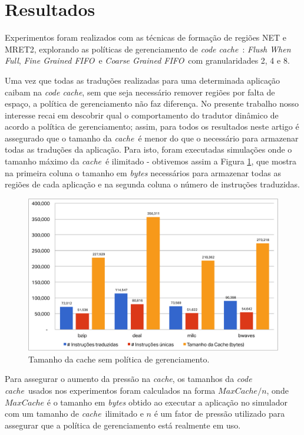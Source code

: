 \documentclass[12pt,twoside]{article}
\newcommand{\ccache}{\emph{code cache}}
\newcommand{\cache}{\emph{cache}}
\newcommand{\flush}{\emph{Flush When Full}}
\newcommand{\finefifo}{\emph{Fine Grained FIFO}}
\newcommand{\coarsefifo}{\emph{Coarse Grained FIFO}}
\begin{document}
\section{Resultados}
Experimentos foram realizados com as técnicas de formação de regiões NET e MRET2, explorando as políticas de gerenciamento de \ccache~: \flush, \finefifo~e \coarsefifo~com granularidades 2, 4 e 8. 

Uma vez que todas as traduções realizadas para uma determinada aplicação caibam na \ccache, sem que seja necessário remover regiões por falta de espaço, a política de gerenciamento não faz diferença. No presente trabalho nosso interesse recai em descobrir qual o comportamento do tradutor dinâmico de acordo a política de gerenciamento; assim, para todos os resultados neste artigo é assegurado que o tamanho da \cache~é menor do que o necessário para armazenar todas as traduções da aplicação. Para isto, foram executadas simulações onde o tamanho máximo da \cache~é ilimitado - obtivemos assim a Figura \ref{fig-cache-sizes}, que mostra na primeira coluna o tamanho em \emph{bytes} necessários para armazenar todas as regiões de cada aplicação e na segunda coluna o número de instruções traduzidas.


\begin{figure}[!ht]
\centering
\includegraphics[scale=0.5]{./figs/cache-sizes}
\caption{Tamanho da cache sem política de gerenciamento.}
\label{fig-cache-sizes}
\end{figure}


Para assegurar o aumento da pressão na \cache, os tamanhos da \ccache~usados nos experimentos foram calculados na forma $MaxCache/n$, onde $MaxCache$ é o tamanho em \emph{bytes} obtido ao executar a aplicação no simulador com um tamanho de \cache~ilimitado e $n$ é um fator de pressão utilizado para assegurar que a política de gerenciamento está realmente em uso.
\end{document}
